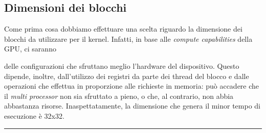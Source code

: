 \documentclass[main.tex]{subfiles}
\begin{document}
\subsection{Dimensioni dei blocchi}

\hspace*{0.25in}Come prima cosa dobbiamo effettuare una scelta riguardo la dimensione dei blocchi da utilizzare per il kernel. Infatti, in base alle \textit{compute capabilities} della GPU, ci saranno 
\begin{minipage}{0.6\textwidth}
\vspace{5pt}
 delle configurazioni che sfruttano meglio l'hardware del dispositivo. Questo dipende, inoltre, dall'utilizzo dei registri da parte dei thread del blocco e dalle operazioni che effettua in proporzione alle richieste in memoria: può accadere che il \textit{multi processor} non sia sfruttato a pieno, o che, al contrario, non abbia abbastanza risorse.
Inaspettatamente, la dimensione che genera il minor tempo di esecuzione è 32x32.
\end{minipage}%
\begin{minipage}{0.4\textwidth}
    \vspace{2pt}
    \centering
    \captionsetup{aboveskip=0pt}
    \vspace{-14pt}\rule{1\linewidth}{0.4pt}
\end{minipage}\\
\end{document}
